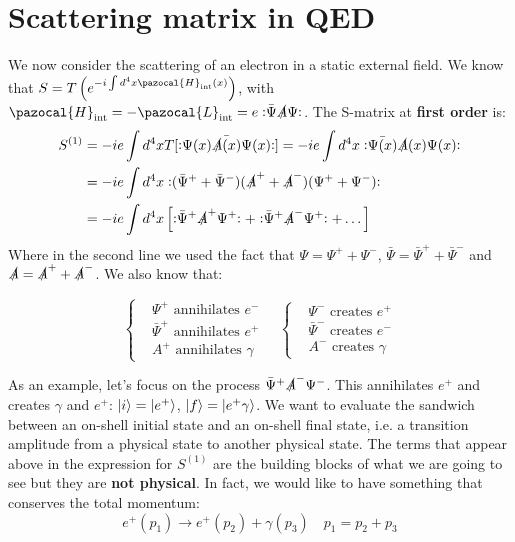 \documentclass[../main.tex]{subfiles}
\begin{document}
\section{Scattering matrix in QED}
We now consider the scattering of an electron in a static external field. We know that $S=T\left(e^{-i\int d^4x\pazocal{H}_{\text{int}}(x)}\right)$, with $\pazocal{H}_{\text{int}}=-\pazocal{L}_{\text{int}}=e\norder{\bar{\Psi}\slashed{A}\Psi}$. The S-matrix at \textbf{first order} is:
\begin{align*}
S^{(1)}&=-ie\int d^4xT[\bar{\vcentcolon\mathrel{\Psi(x)\slashed{A}(x)\Psi(x)}\vcentcolon}]=-ie\int d^4x\vcentcolon\mathrel{\bar{\Psi(x)}\slashed{A}(x)\Psi(x)}\vcentcolon\\
&=-ie\int d^4x\vcentcolon\mathrel{(\bar{\Psi}^++\bar{\Psi}^-)(\slashed{A}^++\slashed{A}^-)(\Psi^++\Psi^-)}\vcentcolon\\
&=-ie\int d^4x\left[\vcentcolon\mathrel{\bar{\Psi}^+\slashed{A}^+\Psi^+}\vcentcolon+\vcentcolon\mathrel{\bar{\Psi}^+\slashed{A}^-\Psi^+}\vcentcolon+\dots\right]
\end{align*}
Where in the second line we used the fact that $\Psi=\Psi^++\Psi^-$, $\bar{\Psi}=\bar{\Psi}^++\bar{\Psi}^-$ and $\slashed{A}=\slashed{A}^++\slashed{A}^-$. We also know that:
\begin{kaobox}[frametitle=Creation and annihilation]
\[
\left\{
\begin{aligned}
&\Psi^+ \text{ annihilates } e^-\\
&\bar{\Psi}^+ \text{ annihilates } e^+\\
&A^+ \text{ annihilates } \gamma
\end{aligned}
\right.
\quad
\left\{
\begin{aligned}
&\Psi^- \text{ creates } e^+\\
&\bar{\Psi}^- \text{ creates } e^-\\
&A^- \text{ creates } \gamma
\end{aligned}
\right.
\]
\end{kaobox}
As an example, let's focus on the process $\bar{\Psi}^+\slashed{A}^-\Psi^-$. This annihilates $e^+$ and creates $\gamma$ and $e^+$: $\ket{i}=\ket{e^+}$, $\ket{f}=\ket{e^+\gamma}$. We want to evaluate the sandwich between an on-shell initial state and an on-shell final state, i.e. a transition amplitude from a physical state to another physical state. The terms that appear above in the expression for $S^{(1)}$ are the building blocks of what we are going to see but they are \textbf{not physical}. In fact, we would like to have something that conserves the total momentum:
\[
e^+(p_1)\xrightarrow[]{}e^+(p_2)+\gamma(p_3) \quad p_1=p_2+p_3
\]
\end{document}
